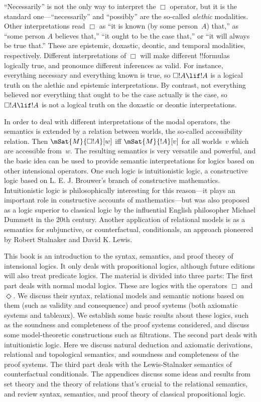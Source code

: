 ``Necessarily'' is not the only way to interpret the $\Box$ operator,
but it is the standard one---``necessarily'' and ``possibly'' are the
so-called \emph{alethic} modalities. Other interpretations read $\Box$
as ``it is known (by some person~$A$) that,'' as ``some person $A$
believes that,'' ``it ought to be the case that,'' or ``it will always
be true that.'' These are epistemic, doxastic, deontic, and temporal
modalities, respectively. Different interpretations of $\Box$ will
make different !!{formula}s logically true, and pronounce different
inferences as valid. For instance, everything necessary and everything
known is true, so $\Box !A \lif !A$ is a logical truth on the alethic
and epistemic interpretations. By contrast, not everything believed
nor everything that ought to be the case actually is the case, so
$\Box !A \lif !A$ is not a logical truth on the doxastic or deontic
interpretations. 

In order to deal with different interpretations of the modal
operators, the semantics is extended by a relation between worlds, the
so-called accessibility relation.  Then $\mSat{M}{\Box !A}[w]$ iff
$\mSat{M}{!A}[v]$ for all worlds~$v$ which are accessible from~$w$.
The resulting semantics is very versatile and powerful, and the basic
idea can be used to provide semantic interpretations for logics based
on other intensional operators. One such logic is intuitionistic
logic, a constructive logic based on L. E. J. Brouwer's branch of
constructive mathematics. Intuitionistic logic is philosophically
interesting for this reason---it plays an important role in
constructive accounts of mathematics---but was also proposed as a logic
superior to classical logic by the influential English philosopher
Michael Dummett in the 20th century. Another application of relational
models is as a semantics for subjunctive, or counterfactual,
conditionals, an approach pioneered by Robert Stalnaker and David K.
Lewis.

This book is an introduction to the syntax, semantics, and proof
theory of intensional logics. It only deals with propositional logics,
although future editions will also treat predicate logics.  The
material is divided into three parts: The first part deals with normal
modal logics. These are logics with the operators $\Box$
and~$\Diamond$. We discuss their syntax, relational models and
semantic notions based on them (such as validity and consequence) and
proof systems (both axiomatic systems and tableaux). We establish some
basic results about these logics, such as the soundness and
completeness of the proof systems considered, and discuss some
model-theoretic constructions such as filtrations. The second part
deals with intuitionistic logic. Here we discuss natural deduction and
axiomatic derivations, relational and topological semantics, and
soundness and completeness of the proof systems. The third part deals
with the Lewis-Stalnaker semantics of counterfactual conditionals. The
appendices discuss some ideas and results from set theory and the
theory of relations that's crucial to the relational semantics, and
review syntax, semantics, and proof theory of classical propositional
logic.
